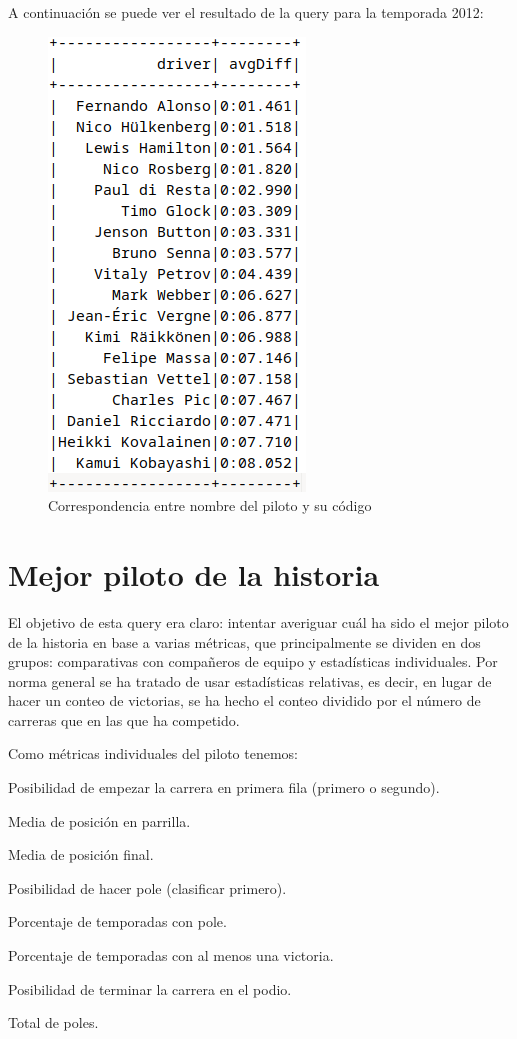 \documentclass[12pt,twoside,titlepage]{report}
\begin{document}
A continuación se puede ver el resultado de la query para la temporada 2012:

\begin{figure}[H]
	\includegraphics[scale=0.4]{results/consistency/2012consistency.png}
	\centering
	\caption{Correspondencia entre nombre del piloto y su código}
	\label{fig:2012consistency}
	\centering
\end{figure}

\section{Mejor piloto de la historia}

El objetivo de esta query era claro: intentar averiguar cuál ha sido el mejor piloto de la historia en base a varias métricas, que principalmente se dividen en dos grupos: comparativas con compañeros de equipo y estadísticas individuales. Por norma general se ha tratado de usar estadísticas relativas, es decir, en lugar de hacer un conteo de victorias, se ha hecho el conteo dividido por el número de carreras que en las que ha competido.

Como métricas individuales del piloto tenemos:
\begin{compactitem}
	\item Posibilidad de empezar la carrera en primera fila (primero o segundo).
	\item Media de posición en parrilla.
	\item Media de posición final.
	\item Posibilidad de hacer pole (clasificar primero).
	\item Porcentaje de temporadas con pole.
	\item Porcentaje de temporadas con al menos una victoria.
	\item Posibilidad de terminar la carrera en el podio.
	\item Total de poles.
\end{compactitem}
\end{document}
